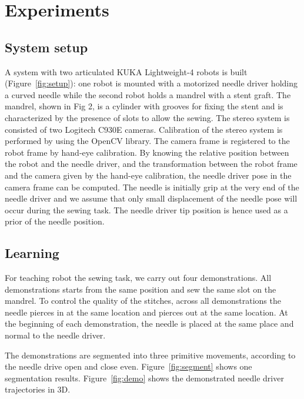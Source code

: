 \section{Experiments}

\subsection{System setup}
A system with two articulated KUKA Lightweight-4 robots is built (Figure~\ref{fig:setup}): one robot is mounted with a motorized needle driver holding a curved needle while the second robot holds a mandrel with a stent graft. The mandrel, shown in Fig 2, is a cylinder with grooves for fixing the stent and is characterized by the presence of slots to allow the sewing. The stereo system is consisted of two Logitech C930E cameras. Calibration of the stereo system is performed by using the OpenCV library. The camera frame is registered to the robot frame by hand-eye calibration. By knowing the relative position between the robot and the needle driver, and the transformation between the robot frame and the camera given by the hand-eye calibration, the needle driver pose in the camera frame can be computed. The needle is initially grip at the very end of the needle driver and we assume that only small displacement of the needle pose will occur during the sewing task. The needle driver tip position is hence used as a prior of the needle position.

\subsection{Learning}
For teaching robot the sewing task, we carry out four demonstrations. All demonstrations starts from the same position and sew the same slot on the mandrel. To control the quality of the stitches, across all demonstrations the needle pierces in at the same location and pierces out at the same location. At the beginning of each demonstration, the needle is placed at the same place and normal to the needle driver.

The demonstrations are segmented into three primitive movements, according to the needle drive open and close even. Figure~\ref{fig:segment} shows one segmentation results. Figure~\ref{fig:demo} shows the demonstrated needle driver trajectories in 3D.

\begin{figure}
\end{figure}

